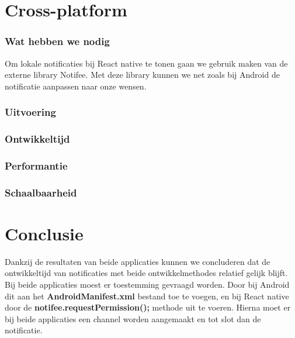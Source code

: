 

\clearpage
\section{Cross-platform}
\subsubsection{Wat hebben we nodig}
Om lokale notificaties bij React native te tonen gaan we gebruik maken van de externe library Notifee.
Met deze library kunnen we net zoals bij Android de notificatie aanpassen naar onze wensen.

\subsubsection{Uitvoering}



\subsubsection{Ontwikkeltijd}



\subsubsection{Performantie}



\subsubsection{Schaalbaarheid}



\section{Conclusie}
Dankzij de resultaten van beide applicaties kunnen we concluderen dat de ontwikkeltijd van notificaties met 
beide ontwikkelmethodes relatief gelijk blijft. Bij beide applicaties moest er toestemming gevraagd worden. 
Door bij Android dit aan het \textbf{AndroidManifest.xml} bestand toe te voegen, en bij React native door 
de \textbf{notifee.requestPermission();} methode uit te voeren. Hierna moet er bij beide applicaties een 
channel worden aangemaakt en tot slot dan de notificatie.

